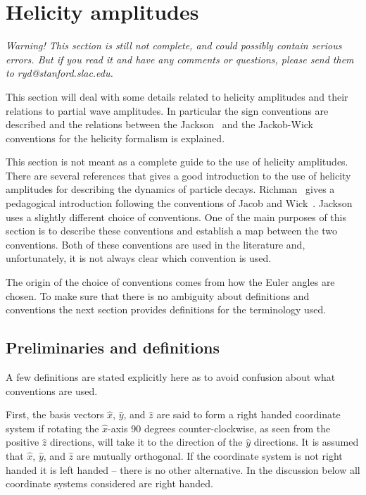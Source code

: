 \section{Helicity amplitudes}
\label{sect:helampconventions}

{\it Warning! This section is still not complete, and could
possibly contain serious errors. But if you read it and have any 
comments or questions, please send them to ryd@stanford.slac.edu.}

This section will deal with some details related to helicity amplitudes
and their relations to partial wave amplitudes. In particular 
the sign conventions are described and
the relations between the Jackson~\cite{Jack64} and the 
Jackob-Wick~\cite{Jaco59} conventions
for the helicity formalism is explained.

This section is not meant as a complete guide to the use of
helicity amplitudes. There are several references that gives a 
good introduction to the use of helicity amplitudes for describing
the dynamics of particle decays. Richman~\cite{Rich84} gives
a pedagogical introduction following the conventions of
Jacob and Wick~\cite{Jaco59}. Jackson~\cite{Jack64} uses a slightly
different choice of conventions. One of the main purposes of this section is
to describe these conventions and establish a map between the two
conventions. Both of these conventions are used in the literature
and, unfortunately, it is not always clear which convention is used. 

The origin of the choice of conventions comes from how the 
Euler angles are chosen. To make sure that there is no ambiguity
about definitions and conventions the next section provides definitions
for the terminology used. 

\subsection{Preliminaries and definitions}

A few definitions are stated explicitly here as to avoid
confusion about what conventions are used.

First, the basis vectors $\hat x$, $\hat y$, and $\hat z$ are
said to form a right handed coordinate system if rotating the
$\hat x$-axis 90 degrees counter-clockwise, as seen from the positive
$\hat z$ directions, will take it to the direction of the $\hat y$
directions. It is assumed that $\hat x$, $\hat y$, and $\hat z$ are
mutually orthogonal. If the coordinate system is not right handed it is 
left handed -- there is no other alternative. In the discussion
below all coordinate systems considered are right handed.

